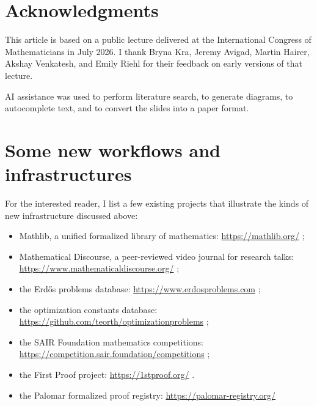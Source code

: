 \documentclass[12pt]{amsart}
\theoremstyle{definition}
\begin{document}
\section{Acknowledgments}\label{ack}

This article is based on a public lecture delivered at the International Congress of Mathematicians in July 2026.  I thank Bryna Kra, Jeremy Avigad, Martin Hairer, Akshay Venkatesh, and Emily Riehl for their feedback on early versions of that lecture.

AI assistance was used to perform literature search, to generate diagrams, to autocomplete text, and to convert the slides into a paper format.

\appendix

\section{Some new workflows and infrastructures}\label{app}

For the interested reader, I list a few existing projects that illustrate the kinds of new infrastructure discussed above:

\begin{itemize}
\item Mathlib, a unified formalized library of mathematics: \url{https://mathlib.org/} \cite{mathlib};
\item Mathematical Discourse, a peer-reviewed video journal for research talks: \url{https://www.mathematicaldiscourse.org/} \cite{discourse};
\item the Erd\H{o}s problems database: \url{https://www.erdosproblems.com} \cite{erdosproblems};
\item the optimization constants database:\\ \url{https://github.com/teorth/optimizationproblems} \cite{optimization};
\item the SAIR Foundation mathematics competitions:\\ \url{https://competition.sair.foundation/competitions} \cite{sair};
\item the First Proof project: \url{https://1stproof.org/} \cite{firstproof-web}.
\item the Palomar formalized proof registry: \url{https://palomar-registry.org/}
\end{itemize}



\end{document}
